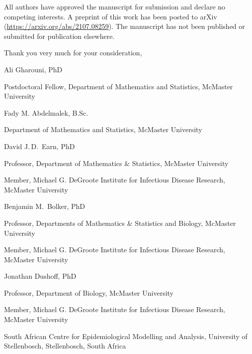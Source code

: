\documentclass[12pt,letterpaper]{letter}
\begin{document}
All authors have approved the manuscript for submission and declare no competing interests. A preprint of this work has been posted to arXiv (\url{https://arxiv.org/abs/2107.08259}). The manuscript has not been published or submitted for publication elsewhere.

Thank you very much for your consideration,

\begin{multicols}{2}
\begin{flushleft}
\footnotesize

Ali Gharouni, PhD
\setlength{\parskip}{0em}

Postdoctoral Fellow, Department of Mathematics and Statistics, McMaster University

\vspace{1em}

Fady M. Abdelmalek, B.Sc.

Department of Mathematics and Statistics, McMaster University

\vspace{1em}

David J.\,D.\ Earn, PhD

Professor, Department of Mathematics \& Statistics, McMaster University

Member, Michael G. DeGroote Institute for Infectious Disease Research, McMaster University

\vfill\null
\columnbreak

Benjamin M.\ Bolker, PhD

Professor, Departments of Mathematics \& Statistics and Biology, McMaster University

Member, Michael G. DeGroote Institute for Infectious Disease Research, McMaster University

\vspace{1em}

Jonathan Dushoff, PhD

Professor, Department of Biology, McMaster University

Member, Michael G. DeGroote Institute for Infectious Disease Research, McMaster University

South African Centre for Epidemiological Modelling and Analysis, University of Stellenbosch, Stellenbosch, South Africa

\end{flushleft}
\end{multicols}

\thispagestyle{empty}
\end{document}
